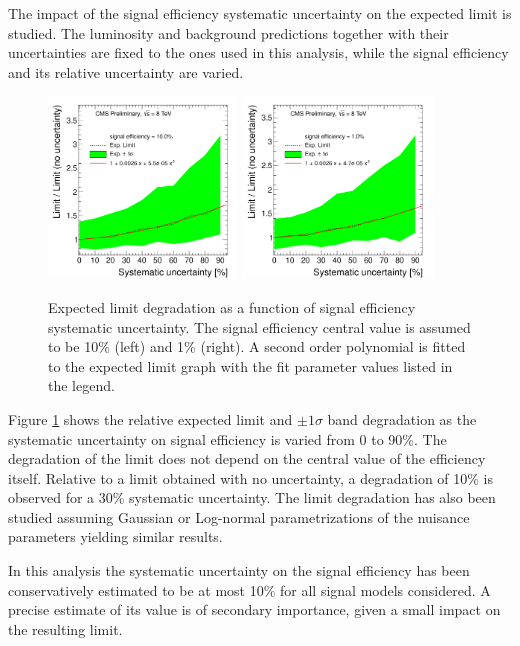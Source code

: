 
The impact of the signal efficiency systematic uncertainty on the expected limit is studied. 
The luminosity and background predictions together with their uncertainties are fixed to the ones used 
in this analysis, while the signal efficiency and its relative uncertainty are varied.


\begin{figure}[htbp]
\centering
\includegraphics[width=0.45\textwidth]{plots/degradation/10percent.pdf}
\includegraphics[width=0.45\textwidth]{plots/degradation/1percent.pdf}
\caption{Expected limit degradation as a function of signal efficiency systematic uncertainty.
The signal efficiency central value is assumed to be 10\% (left) and 1\% (right). A second order polynomial
is fitted to the expected limit graph with the fit parameter values listed in the legend.\label{fig:degradation}}
\end{figure}

Figure \ref{fig:degradation} shows the relative expected limit and $\pm1\sigma$ band degradation as the 
systematic uncertainty on signal efficiency is varied from 0 to 90\%. The degradation of the limit does not depend
on the central value of the efficiency itself. Relative to a limit obtained with no uncertainty, a 
degradation of 10\% is observed for a 30\% systematic uncertainty. The limit degradation has also been studied 
assuming Gaussian or Log-normal parametrizations of the nuisance parameters yielding similar results.

In this analysis the systematic uncertainty on the signal efficiency has been conservatively 
estimated to be at most 10\% for all signal models considered. A precise estimate of its value is of secondary importance, given a small impact on the resulting limit.
      

